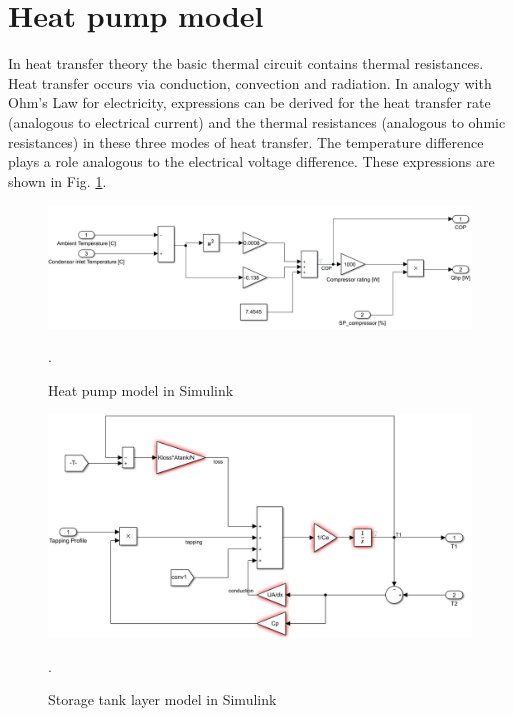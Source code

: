 \section{Heat pump model}

In heat transfer theory the basic thermal circuit contains thermal resistances. Heat transfer occurs via conduction, convection and radiation. In analogy with Ohm's Law for electricity, expressions can be derived for the heat transfer rate (analogous to electrical current) and the thermal resistances (analogous to ohmic resistances) in these three modes of heat transfer. The temperature difference plays a role analogous to the electrical voltage difference. These expressions are shown in Fig. \ref{fig:hpsimulink}.
\begin{figure}[H]
	\centering
	\includegraphics[width=0.8\columnwidth]{Pictures/Heat_Pump.png}
	\caption[Short title]{Heat pump model in Simulink \cite{GIGO}}.
	\label{fig:hpsimulink}
\end{figure}




\begin{figure}[H]
	\centering
	\includegraphics[width=0.8\columnwidth]{Pictures/Layer.png}
	\caption[Short title]{Storage tank layer model in Simulink}.
	\label{fig:layersimulink}
\end{figure}

